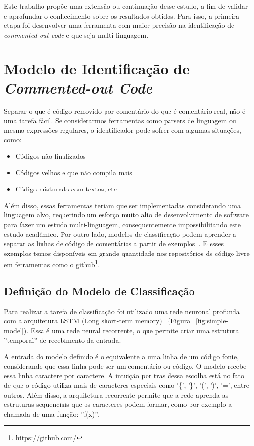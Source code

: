 \documentclass[12pt]{article}
\begin{document}
Este trabalho propõe uma extensão ou continuação desse estudo, a fim de validar
e aprofundar o conhecimento sobre os resultados obtidos. Para isso, a primeira etapa foi 
desenvolver uma ferramenta com maior precisão na identificação de 
\textit{commented-out code} e que seja multi linguagem.  

\section{Modelo de Identificação de \textit{Commented-out Code}}

Separar o que é código removido por comentário do que é comentário real, não é
uma tarefa fácil. Se considerarmos ferramentas como parsers de linguagem ou
mesmo expressões regulares, o identificador pode sofrer com algumas situações, como:
\begin{itemize}
  \item[1] Códigos não finalizados
  \item[2] Códigos velhos e que não compila mais
  \item[3] Código misturado com textos, etc. 
\end{itemize}

Além disso, essas ferramentas teriam que ser implementadas considerando uma linguagem
alvo, requerindo um esforço muito alto de desenvolvimento de software para fazer um 
estudo multi-linguagem, consequentemente impossibilitando este estudo acadêmico. Por 
outro lado, modelos de classificação podem aprender a separar as linhas de código de 
comentários a partir de exemplos~\cite{patternClassification}. E esses exemplos temos 
disponíveis em grande quantidade nos repositórios de código livre em ferramentas como 
o github\footnote{https://github.com/}.

\subsection{Definição do Modelo de Classificação}

Para realizar a tarefa de classificação foi utilizado uma rede neuronal profunda com
a arquitetura LSTM (Long short-term memory)~\cite{gers1999learning} (Figura ~\ref{fig:simple-model}). 
Essa é uma rede neural recorrente, o que permite criar uma estrutura ''temporal'' de recebimento da 
entrada.

A entrada do modelo definido é o equivalente a uma linha de um código fonte, considerando
que essa linha pode ser um comentário ou código. O modelo recebe essa linha caractere por 
caractere. A intuição por tras dessa escolha está no fato de que o código utiliza mais de
caracteres especiais como '\{', '\}', '(', ')', '=', entre outros. Além disso, a 
arquitetura recorrente permite que a rede aprenda as estruturas sequenciais que os caracteres
podem formar, como por exemplo a chamada de uma função: ''f(x)''.
\end{document}
